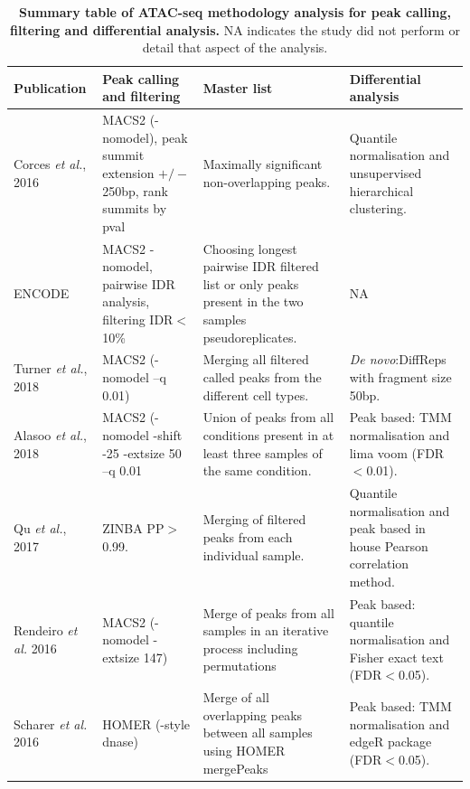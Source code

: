 \begin{landscape}
\begin{center}
\begin{longtable}[ht]{p{.20\textheight} p{.40\textheight} p{.40\textheight} p{.40\textheight}}
\caption[Summary table of ATAC-seq methodology analysis for peak calling, filtering and differential analysis.]{\textbf{Summary table of ATAC-seq methodology analysis for peak calling, filtering and differential analysis.} NA indicates the study did not perform or detail that aspect of the analysis.}
\label{tab:ATAC_comparative_methods} \\
\toprule
\textbf{Publication} & \textbf{Peak calling and filtering} & \textbf{Master list} & \textbf{Differential analysis} \\
\midrule
\midrule
Corces \textit{et al.}, 2016 & MACS2 (-nomodel), peak summit extension $+/-$250bp, rank summits by pval & Maximally significant non-overlapping peaks. & Quantile normalisation and unsupervised hierarchical clustering. \\
ENCODE  & MACS2 -nomodel, pairwise IDR analysis, filtering IDR$<$10\% & Choosing longest pairwise IDR filtered list or only peaks present in the two samples pseudoreplicates. & NA \\            
Turner \textit{et al.}, 2018 	& MACS2 (-nomodel --q 0.01) & Merging all filtered called peaks from the different cell types. & \textit{De novo}:DiffReps with fragment size 50bp. \\             																																						Alasoo \textit{et al.}, 2018 & MACS2 (-nomodel -shift -25 -extsize 50 --q 0.01 &	Union of peaks from all conditions present in at least three samples of the same condition. & Peak based: TMM normalisation and lima voom (FDR$<$0.01).\\ 
Qu \textit{et al.}, 2017 & ZINBA PP$>$0.99. & Merging of filtered peaks from each individual sample. & Quantile normalisation and peak based in house Pearson correlation method. \\							
Rendeiro \textit{et al.} 2016 & MACS2 (-nomodel -extsize 147)	& Merge of peaks from all samples in an iterative process including permutations & Peak based: quantile normalisation and Fisher exact text (FDR$<$0.05). \\
Scharer \textit{et al.} 2016 & HOMER (-style dnase) & Merge of all overlapping peaks between all samples using HOMER mergePeaks & Peak based: TMM normalisation and edgeR package (FDR$<$0.05). \\														   
\bottomrule
\end{longtable}
\end{center}
\end{landscape}


